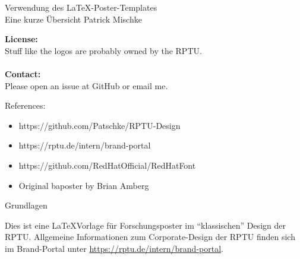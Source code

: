 \documentclass[
  a0paper,
  portrait,
  fontscale=.35 %
  ]{baposterrptu}
\begin{document}
\begin{poster}{
  }
  {}%
  {Verwendung des \LaTeX-Poster-Templates\\
    \sf  Eine kurze Übersicht}
  {Patrick Mischke}
  {\rptuLogo}
  {
    \begin{minipage}{.8\footerheight}
    \end{minipage}
    \hfill
    \begin{minipage}{.35\paperwidth}
      \textbf{License:}\\
      Stuff like the logos are probably owned by the RPTU.\\\\
      \textbf{Contact:}\\
      Please open an issue at GitHub or email me.
    \end{minipage}
  }
  {
    References:
    \begin{itemize}
      \item https://github.com/Patschke/RPTU-Design
      \item https://rptu.de/intern/brand-portal
      \item https://github.com/RedHatOfficial/RedHatFont
      \item Original baposter by Brian Amberg
    \end{itemize}
  }
  \begin{posterbox}[name=intro,column=0,row=0]{Grundlagen}

    Dies ist eine \LaTeX Vorlage für Forschungsposter im "`klassischen"' Design der RPTU. Allgemeine Informationen zum Corporate-Design der RPTU finden sich im Brand-Portal unter \url{https://rptu.de/intern/brand-portal}.\\


\end{posterbox}
\end{poster}
\end{document}
